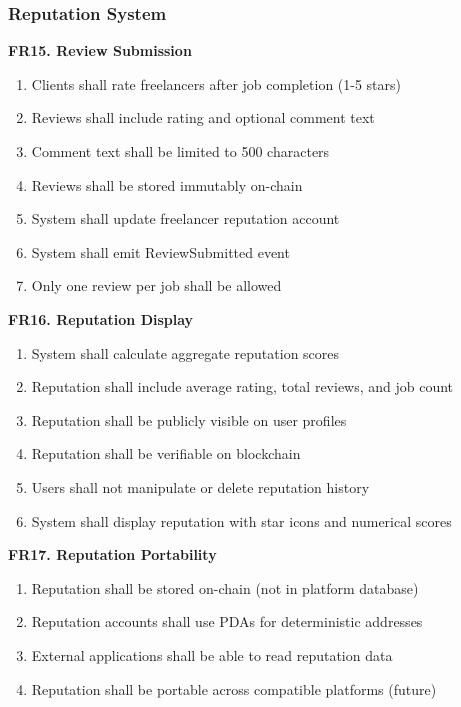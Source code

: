 \documentclass[a4paper,13pt,twoside]{report}
\theoremstyle{definition}
\begin{document}
\subsubsection{Reputation System}

\textbf{FR15. Review Submission}

\begin{enumerate}
    \item Clients shall rate freelancers after job completion (1-5 stars)
    \item Reviews shall include rating and optional comment text
    \item Comment text shall be limited to 500 characters
    \item Reviews shall be stored immutably on-chain
    \item System shall update freelancer reputation account
    \item System shall emit ReviewSubmitted event
    \item Only one review per job shall be allowed
\end{enumerate}

\textbf{FR16. Reputation Display}

\begin{enumerate}
    \item System shall calculate aggregate reputation scores
    \item Reputation shall include average rating, total reviews, and job count
    \item Reputation shall be publicly visible on user profiles
    \item Reputation shall be verifiable on blockchain
    \item Users shall not manipulate or delete reputation history
    \item System shall display reputation with star icons and numerical scores
\end{enumerate}

\textbf{FR17. Reputation Portability}

\begin{enumerate}
    \item Reputation shall be stored on-chain (not in platform database)
    \item Reputation accounts shall use PDAs for deterministic addresses
    \item External applications shall be able to read reputation data
    \item Reputation shall be portable across compatible platforms (future)
\end{enumerate}
\end{document}

